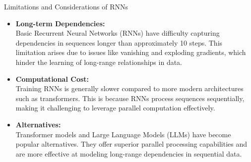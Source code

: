\begin{frame}{Limitations and Considerations of RNNs}
    \begin{itemize}
        \item \textbf{Long-term Dependencies:} \\
        Basic Recurrent Neural Networks (RNNs) have difficulty capturing dependencies in sequences longer than approximately 10 steps. This limitation arises due to issues like vanishing and exploding gradients, which hinder the learning of long-range relationships in data.
        
        \item \textbf{Computational Cost:} \\
        Training RNNs is generally slower compared to more modern architectures such as transformers. This is because RNNs process sequences sequentially, making it challenging to leverage parallel computation effectively.
        
        \item \textbf{Alternatives:} \\
        Transformer models and Large Language Models (LLMs) have become popular alternatives. They offer superior parallel processing capabilities and are more effective at modeling long-range dependencies in sequential data.
    \end{itemize}
\end{frame}